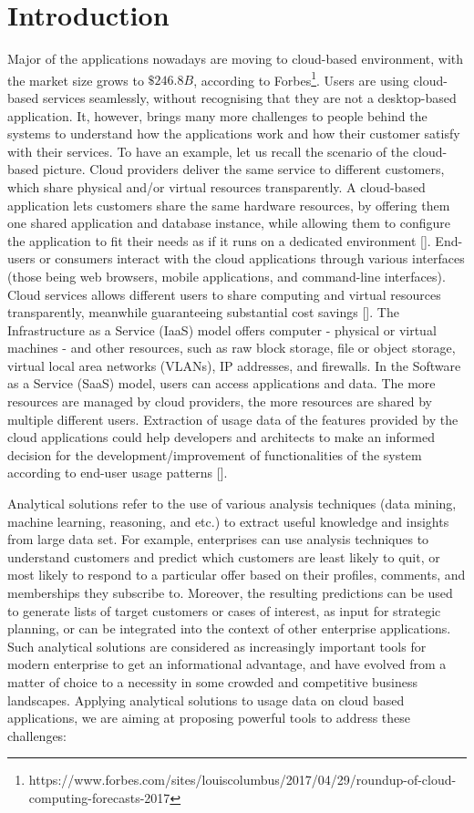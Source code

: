 \section{Introduction}\label{sec:Introduction}
%
Major of the applications nowadays are moving to cloud-based environment, with the market size grows to $\$246.8B$, according to Forbes\footnote{https://www.forbes.com/sites/louiscolumbus/2017/04/29/roundup-of-cloud-computing-forecasts-2017}. Users are using cloud-based services seamlessly, without recognising that they are not a desktop-based application. It, however, brings many more challenges to people behind the systems to understand how the applications work and how their customer satisfy with their services. To have an example, let us recall the scenario of the cloud-based picture. Cloud providers deliver the same service to different customers, which share physical and/or virtual resources transparently. A cloud-based application lets customers share the same hardware resources, by offering them one shared application and database instance, while allowing them to configure the application to fit their needs as if it runs on a dedicated environment []. End-users or consumers interact with the cloud applications through various interfaces (those being web browsers, mobile applications, and command-line interfaces). Cloud services allows different users to share computing and virtual resources transparently, meanwhile guaranteeing substantial cost savings []. The Infrastructure as a Service (IaaS) model offers computer - physical or virtual machines - and other resources, such as raw block storage, file or object storage, virtual local area networks (VLANs), IP addresses, and firewalls. In the Software as a Service (SaaS) model, users can access applications and data. The more resources are managed by cloud providers, the more resources are shared by multiple different users. Extraction of usage data of the features provided by the cloud applications could help developers and architects to make an informed decision for the development/improvement of functionalities of the system according to end-user usage patterns []. 

Analytical solutions refer to the use of various analysis techniques (data mining, machine learning, reasoning, and etc.) to extract useful knowledge and insights from large data set. For example, enterprises can use analysis techniques to understand customers and predict which customers are least likely to quit, or most likely to respond to a particular offer based on their profiles, comments, and memberships they subscribe to. Moreover, the resulting predictions can be used to generate lists of target customers or cases of interest, as input for strategic planning, or can be integrated into the context of other enterprise applications. Such analytical solutions are considered as increasingly important tools for modern enterprise to get an informational advantage, and have evolved from a matter of choice to a necessity in some crowded and competitive business landscapes. Applying analytical solutions to usage data on cloud based applications, we are aiming at proposing powerful tools to address these challenges: 

